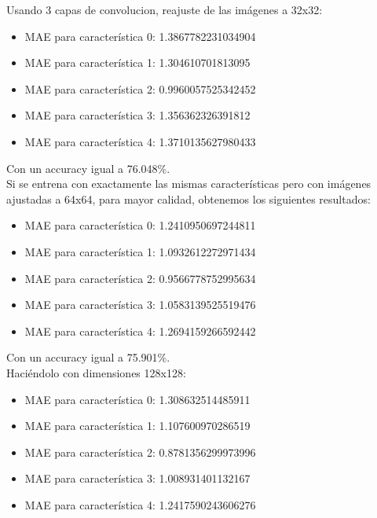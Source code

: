 \documentclass[10pt, a4paper]{article}
\begin{document}
                Usando 3 capas de convolucion, reajuste de las im\'agenes a 32x32:\\
                \begin{itemize}
                    \item[] MAE para caracter\'istica 0: 1.3867782231034904 
                    \item[] MAE para caracter\'istica 1: 1.304610701813095 
                    \item[] MAE para caracter\'istica 2: 0.9960057525342452
                    \item[] MAE para caracter\'istica 3: 1.356362326391812
                    \item[] MAE para caracter\'istica 4: 1.3710135627980433
                \end{itemize}
                
                Con un accuracy igual a 76.048\%.\\

                Si se entrena con exactamente las mismas caracter\'isticas pero con im\'agenes ajustadas a 64x64, para mayor calidad, obtenemos los siguientes resultados:
                \begin{itemize}
                    \item[] MAE para caracter\'istica 0: 1.2410950697244811
                    \item[] MAE para caracter\'istica 1: 1.0932612272971434
                    \item[] MAE para caracter\'istica 2: 0.9566778752995634
                    \item[] MAE para caracter\'istica 3: 1.0583139525519476
                    \item[] MAE para caracter\'istica 4: 1.2694159266592442
                \end{itemize}
                
                Con un accuracy igual a 75.901\%.\\

                Haci\'endolo con dimensiones 128x128:
                \begin{itemize}
                    \item[] MAE para caracter\'istica 0: 1.308632514485911
                    \item[] MAE para caracter\'istica 1: 1.107600970286519
                    \item[] MAE para caracter\'istica 2: 0.8781356299973996
                    \item[] MAE para caracter\'istica 3: 1.008931401132167
                    \item[] MAE para caracter\'istica 4: 1.2417590243606276
                \end{itemize}
                
\end{document}
